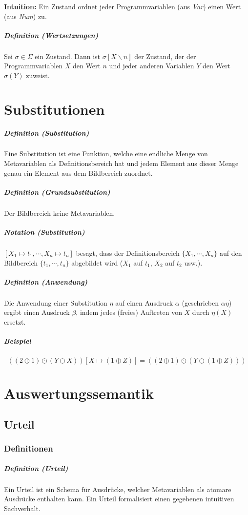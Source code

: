 \documentclass[a4paper, 11pt, accentcolor = tud3b]{tudreport}
\newcommand{\subsubparagraph}[1]{\hspace{1cm} \textbf{#1:}}
\newcommand{\definition}[2]{\subparagraph{Definition (#1)} #2}
\newcommand{\notation}[2]{\subparagraph{Notation (#1)} #2}
\newcommand{\intuition}[1]{\subsubparagraph{Intuition} #1}
\begin{document}
		    \intuition{Ein Zustand ordnet jeder Programmvariablen (aus \textit{Var}) einen Wert (aus \textit{Num}) zu.}
		    
		    \definition{Wertsetzungen}{Sei $ \sigma \in \Sigma $ ein Zustand. Dann ist $ \sigma[X \backslash n] $ der Zustand, der der Programmvariablen $ X $ den Wert $ n $ und jeder anderen Variablen $ Y $ den Wert $ \sigma(Y) $ zuweist.}
	    
	    \section{Substitutionen}
		    \definition{Substitution}{Eine Substitution ist eine Funktion, welche eine endliche Menge von Metavariablen als Definitionsbereich hat und jedem Element aus dieser Menge genau ein Element aus dem Bildbereich zuordnet.}
		    
		    \definition{Grundsubstitution}{Der Bildbereich keine Metavariablen.}
		    
		    \notation{Substitution}{$ [X _ 1 \mapsto t _ 1, \cdots, X _ n \mapsto t _ n] $ besagt, dass der Definitionsbereich $ \{ X _ 1, \cdots, X _ n \} $ auf den Bildbereich $ \{ t _ 1, \cdots, t _ n \} $ abgebildet wird ($ X _ 1 $ auf $ t _ 1 $, $ X _ 2 $ auf $ t _ 2 $ usw.).}
		    
		    \definition{Anwendung}{Die Anwendung einer Substitution $ \eta $ auf einen Ausdruck $ \alpha $ (geschrieben $ \alpha\eta $) ergibt einen Ausdruck $ \beta $, indem jedes (freies) Auftreten von $ X $ durch $ \eta(X) $ ersetzt.}
		    
		    \subparagraph{Beispiel}
		    \begin{equation*}
			    ((2 \oplus 1) \odot (Y \ominus X))[X \mapsto (1 \oplus Z)] = ((2 \oplus 1) \odot (Y \ominus (1 \oplus Z)))
		    \end{equation*}
	    
	    \section{Auswertungssemantik}
		    \subsection{Urteil}
			    \subsubsection{Definitionen}
				    \definition{Urteil}{Ein Urteil ist ein Schema für Ausdrücke, welcher Metavariablen als atomare Ausdrücke enthalten kann. Ein Urteil formalisiert einen gegebenen intuitiven Sachverhalt.}
				    
\end{document}
